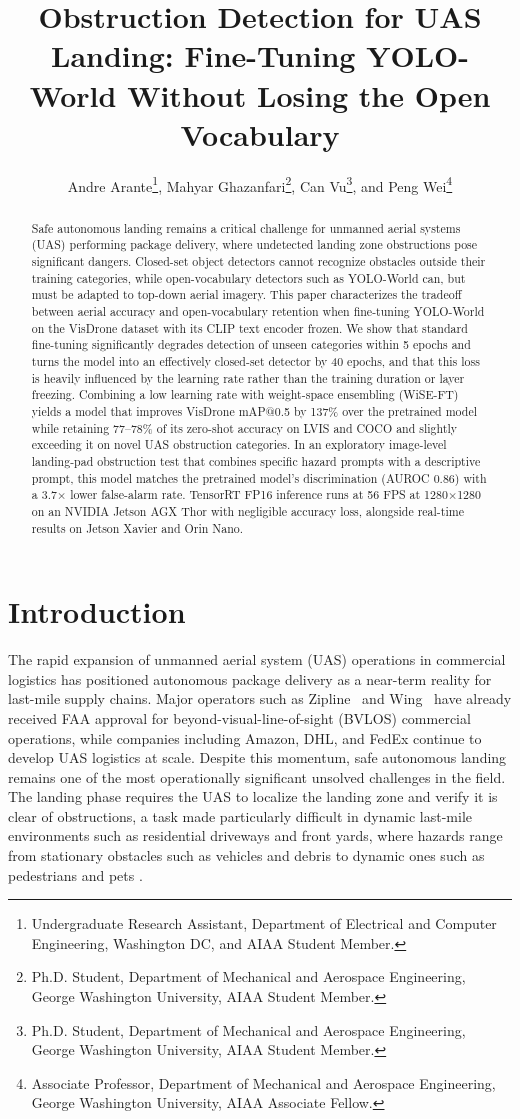 \documentclass[conf]{new-aiaa}
\title{Obstruction Detection for UAS Landing: Fine-Tuning YOLO-World Without Losing the Open Vocabulary}
\author{Andre Arante\footnote{Undergraduate Research Assistant, Department of Electrical and Computer Engineering, Washington DC, and AIAA Student Member.}, Mahyar Ghazanfari\footnote{Ph.D. Student, Department of Mechanical and Aerospace Engineering, George Washington University, AIAA Student Member.}, Can Vu\footnote{Ph.D. Student, Department of Mechanical and Aerospace Engineering, George Washington University, AIAA Student Member.}, and Peng Wei\footnote{Associate Professor, Department of Mechanical and Aerospace Engineering, George Washington University, AIAA Associate Fellow.
}}
\affil{George Washington University, Washington, DC, 20052}
\begin{document}
\maketitle

\begin{abstract}

Safe autonomous landing remains a critical challenge for unmanned aerial systems (UAS)
performing package delivery, where undetected landing zone obstructions pose significant
dangers. Closed-set object detectors cannot recognize obstacles outside their training
categories, while open-vocabulary detectors such as YOLO-World can, but must be adapted to
top-down aerial imagery. This paper characterizes the tradeoff between aerial accuracy and
open-vocabulary retention when fine-tuning YOLO-World on the VisDrone dataset with its CLIP
text encoder frozen. We show that standard fine-tuning significantly degrades detection of
unseen categories within 5 epochs and turns the model into an effectively closed-set
detector by 40 epochs, and that this loss is heavily influenced by the learning rate rather than the
training duration or layer freezing. Combining a low learning rate with weight-space
ensembling (WiSE-FT) yields a model that improves VisDrone mAP@0.5 by 137\% over the
pretrained model while retaining 77--78\% of its zero-shot accuracy on LVIS and COCO and
slightly exceeding it on novel UAS obstruction categories. In an exploratory image-level
landing-pad obstruction test that combines specific hazard prompts with a descriptive prompt,
this model matches the pretrained model's discrimination (AUROC 0.86) with a 3.7$\times$ lower
false-alarm rate. TensorRT FP16 inference runs at 56 FPS at 1280$\times$1280 on an NVIDIA
Jetson AGX Thor with negligible accuracy loss, alongside real-time results on Jetson Xavier
and Orin Nano.


\end{abstract}

\section{Introduction}

The rapid expansion of unmanned aerial system 
(UAS) operations in commercial logistics has positioned 
autonomous package delivery as a near-term reality for 
last-mile supply chains. Major operators such as 
Zipline~\cite{zipline2025} and Wing~\cite{wing2025} have 
already received FAA approval for beyond-visual-line-of-sight 
(BVLOS) commercial operations, while companies including 
Amazon, DHL, and FedEx continue to develop UAS logistics 
at scale.\cite{marquand2023faa, zieher2024drones} Despite 
this momentum, safe autonomous landing remains one of the 
most operationally significant unsolved challenges in the 
field. The landing phase requires the UAS to localize the 
landing zone and verify it is clear of obstructions, a 
task made particularly difficult in dynamic last-mile 
environments such as residential driveways and front yards, 
where hazards range from stationary obstacles such as 
vehicles and debris to dynamic ones such as pedestrians 
and pets \cite{alam2023survey}.
\end{document}

